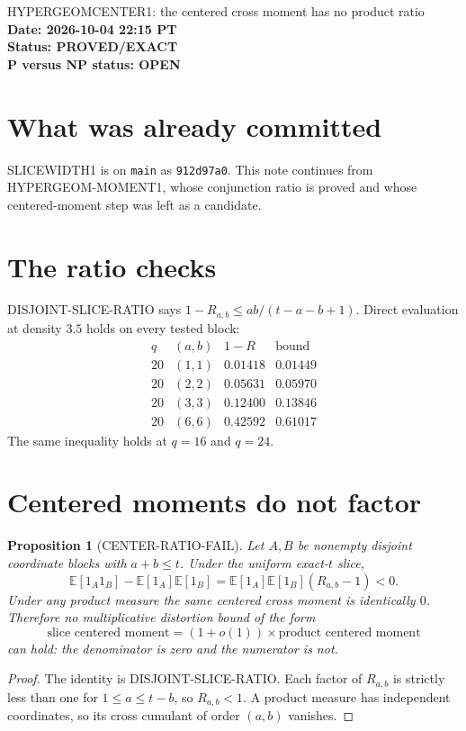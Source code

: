 \documentclass[11pt]{article}
\newtheorem{proposition}{Proposition}
\begin{document}
\begin{center}
{\Large HYPERGEOMCENTER1: the centered cross moment has no product ratio}\\[4pt]
\textbf{Date: 2026-10-04 22:15 PT}\\
\textbf{Status: PROVED/EXACT}\\
\textbf{P versus NP status: OPEN}
\end{center}

\section{What was already committed}
SLICEWIDTH1 is on \texttt{main} as \texttt{912d97a0}. This note continues from HYPERGEOM-MOMENT1, whose conjunction ratio is proved and whose centered-moment step was left as a candidate.

\section{The ratio checks}
DISJOINT-SLICE-RATIO says $1-R_{a,b}\le ab/(t-a-b+1)$. Direct evaluation at density $3.5$ holds on every tested block:
\[
\begin{array}{c|c|c|c}
q&(a,b)&1-R&\text{bound}\\
\hline
20&(1,1)&0.01418&0.01449\\
20&(2,2)&0.05631&0.05970\\
20&(3,3)&0.12400&0.13846\\
20&(6,6)&0.42592&0.61017
\end{array}
\]
The same inequality holds at $q=16$ and $q=24$.

\section{Centered moments do not factor}
\begin{proposition}[CENTER-RATIO-FAIL]
Let $A,B$ be nonempty disjoint coordinate blocks with $a+b\le t$. Under the uniform exact-$t$ slice,
\[
\mathbb E[1_A 1_B]-\mathbb E[1_A]\mathbb E[1_B]
=\mathbb E[1_A]\mathbb E[1_B](R_{a,b}-1)<0.
\]
Under any product measure the same centered cross moment is identically $0$. Therefore no multiplicative distortion bound of the form
\[
\text{slice centered moment}=(1+o(1))\times\text{product centered moment}
\]
can hold: the denominator is zero and the numerator is not.
\end{proposition}
\begin{proof}
The identity is DISJOINT-SLICE-RATIO. Each factor of $R_{a,b}$ is strictly less than one for $1\le a\le t-b$, so $R_{a,b}<1$. A product measure has independent coordinates, so its cross cumulant of order $(a,b)$ vanishes.
\end{proof}
\end{document}
